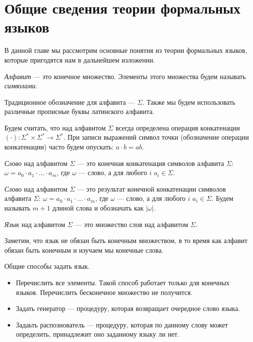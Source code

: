 \section{Общие сведения теории формальных языков}

В данной главе мы рассмотрим основные понятия из теории формальных языков, которые пригодятся нам в дальнейшем изложении.

\begin{definition}
\textit{Алфавит} --- это конечное множество.
Элементы этого множества будем называть \textit{символами}.
\end{definition}

Традиционное обозначение для алфавита --- $\Sigma$.
Также мы будем использовать различные прописные буквы латинского алфавита.

Будем считать, что над алфавитом $\Sigma$ всегда определена операция конкатенации $(\cdot): \Sigma^* \times \Sigma^* \to \Sigma^*$.
При записи выражений символ точки (обозначение операции конкатенации) часто будем опускать: $a \cdot b = ab$.

\begin{definition}
\textit{Слово} над алфавитом $\Sigma$ --- это конечная конкатенация символов алфавита $\Sigma$: $\omega = a_0 \cdot a_1 \cdot \ldots \cdot a_m$, где $\omega$ --- слово, а для любого $i$ $a_i \in \Sigma$.
\end{definition}

\begin{definition}
\textit{Слово} над алфавитом $\Sigma$ --- это результат конечной конкатенации символов алфавита $\Sigma$: $\omega = a_0 \cdot a_1 \cdot \ldots \cdot a_m$, где $\omega$ --- слово, а для любого $i$ $a_i \in \Sigma$.
Будем называть $m + 1$ длиной слова и обозначать как $|\omega|$.
\end{definition}

\begin{definition}
\textit{Язык} над алфавитом $\Sigma$ --- это множество слов над алфавитом $\Sigma$.
\end{definition}

Заметим, что язык не обязан быть конечным множеством, в то время как алфавит обязан быть конечным и изучаем мы конечные слова.

Общие способы задать язык.
\begin{itemize}
\item Перечислить все элементы. Такой способ работает только для конечных языков. Перечислить бесконечное множество не получится.
\item Задать генератор --- процедуру, которая возвращает очередное слово языка.
\item Задаьть распознователь --- процедуру, которая по данному слову может определить, принадлежит оно заданному языку ли нет.
\end{itemize}


